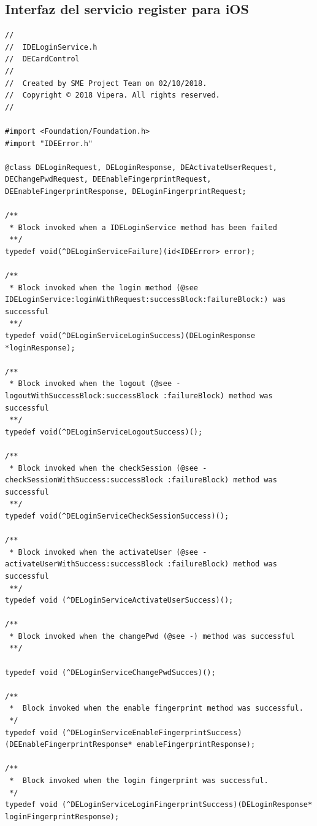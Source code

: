 \documentclass[a4paper, 12pt]{article}
\newenvironment{code}{\captionsetup{type=listing}}{}
\begin{document}
\subsection{Interfaz del servicio register para iOS}
\label{sec-6-1}
\begin{code}
\label{code:ios-interface}
\begin{verbatim}
//
//  IDELoginService.h
//  DECardControl
//
//  Created by SME Project Team on 02/10/2018.
//  Copyright © 2018 Vipera. All rights reserved.
//

#import <Foundation/Foundation.h>
#import "IDEError.h"

@class DELoginRequest, DELoginResponse, DEActivateUserRequest, DEChangePwdRequest, DEEnableFingerprintRequest, DEEnableFingerprintResponse, DELoginFingerprintRequest;

/**
 * Block invoked when a IDELoginService method has been failed
 **/
typedef void(^DELoginServiceFailure)(id<IDEError> error);

/**
 * Block invoked when the login method (@see IDELoginService:loginWithRequest:successBlock:failureBlock:) was successful
 **/
typedef void(^DELoginServiceLoginSuccess)(DELoginResponse *loginResponse);

/**
 * Block invoked when the logout (@see -logoutWithSuccessBlock:successBlock :failureBlock) method was successful
 **/
typedef void(^DELoginServiceLogoutSuccess)();

/**
 * Block invoked when the checkSession (@see -checkSessionWithSuccess:successBlock :failureBlock) method was successful
 **/
typedef void(^DELoginServiceCheckSessionSuccess)();

/**
 * Block invoked when the activateUser (@see -activateUserWithSuccess:successBlock :failureBlock) method was successful
 **/
typedef void (^DELoginServiceActivateUserSuccess)();

/**
 * Block invoked when the changePwd (@see -) method was successful
 **/

typedef void (^DELoginServiceChangePwdSucces)();

/**
 *  Block invoked when the enable fingerprint method was successful.
 */
typedef void (^DELoginServiceEnableFingerprintSuccess)(DEEnableFingerprintResponse* enableFingerprintResponse);

/**
 *  Block invoked when the login fingerprint was successful.
 */
typedef void (^DELoginServiceLoginFingerprintSuccess)(DELoginResponse* loginFingerprintResponse);


\end{verbatim}
\end{code}
\end{document}

